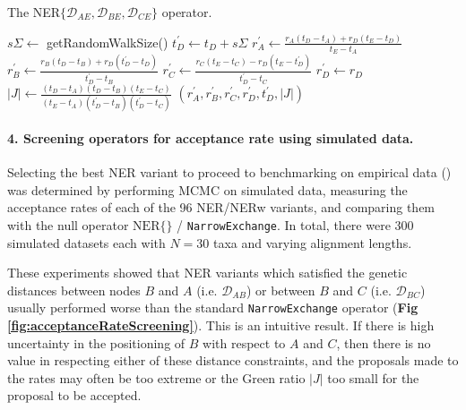 \documentclass[10pt,letterpaper]{article}
\begin{document}
\begin{algorithm}
\caption{The NER$\{ \mathcal{D}_{AE}, \mathcal{D}_{BE}, \mathcal{D}_{CE} \}$ operator.}
\begin{algorithmic}[1]


	\State
    \State $s\Sigma \leftarrow $ getRandomWalkSize() 
    \State $t_D^\prime \leftarrow t_D + s\Sigma$ 
    \State
    \State $r_A^\prime \leftarrow \frac{r_A(t_D - t_A) + r_D(t_E - t_D)}{t_E - t_A}$ 
    \State $r_B^\prime \leftarrow \frac{r_B(t_D - t_B) + r_D(t_D^\prime - t_D)}{t_D^\prime - t_B}$
    \State $r_C^\prime \leftarrow \frac{r_C(t_E - t_C) - r_D(t_E - t_D^\prime)}{t_D^\prime - t_C}$
    \State $r_D^\prime \leftarrow r_D$
    \State
    \State $|J| \leftarrow \frac{(t_D - t_A)(t_D - t_B)(t_E - t_C)}{(t_E - t_A)(t_D^\prime - t_B)(t_D^\prime - t_C)}$ 
    \State \Return $(r_A^\prime, r_B^\prime, r_C^\prime, r_D^\prime, t_D^\prime, |J|)$
    
\EndProcedure

\end{algorithmic}
\label{alg:NER2}
\end{algorithm}





\paragraph{4. Screening operators for acceptance rate using simulated data.}


Selecting the best NER variant to proceed to benchmarking on empirical data (\textbf{}) was determined by performing MCMC on simulated data, measuring the acceptance rates of each of the 96 NER/NERw variants, and comparing them with the null operator $\text{NER}\{\}$ / \texttt{NarrowExchange}. 
In total, there were 300 simulated datasets each with $N=30$ taxa and varying alignment lengths.



These experiments showed that NER variants which satisfied the genetic distances between nodes $B$ and $A$ (i.e. $\mathcal{D}_{AB}$) or between $B$ and $C$ (i.e. $\mathcal{D}_{BC}$) usually performed worse than the standard \texttt{NarrowExchange} operator (\textbf{Fig \ref{fig:acceptanceRateScreening}}).
This is an intuitive result. 
If there is high uncertainty in the positioning of $B$ with respect to $A$ and $C$, then there is no value in respecting either of these distance constraints, and the proposals made to the rates may often be too extreme or the Green ratio $|J|$ too small for the proposal to be accepted.
\end{document}
